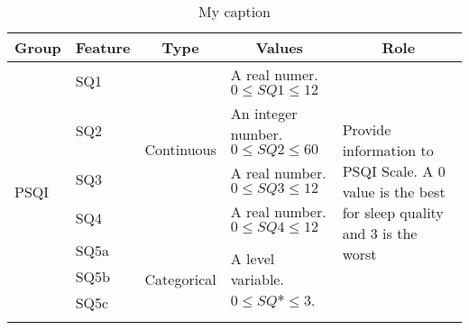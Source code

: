 \documentclass[10pt,letterpaper,oneside]{article}
\begin{document}
\begin{table}[]
	\centering
	\caption{My caption}
	\label{my-label}
	\begin{tabular}{|l|l|l|p{3cm}|p{5cm}|}
		\hline
		\multicolumn{1}{|c|}{\textbf{Group}} & \multicolumn{1}{c|}{\textbf{Feature}} & \multicolumn{1}{c|}{\textbf{Type}} & \multicolumn{1}{c|}{\textbf{Values}}                    & \multicolumn{1}{c|}{\textbf{Role}}                                                                              \\ \hline
		\multirow{18}{*}{PSQI}               & SQ1                                   & \multirow{4}{*}{Continuous}        & A real numer.   $ 0 \leq  SQ1 \leq 12 $                    & \multirow{18}{5cm}{Provide information to PSQI Scale. A 0 value is the best for sleep quality and 3 is the worst} \\ \cline{2-2} \cline{4-4}
		& SQ2                                   &                                    & An integer number. $ 0 \leq SQ2 \leq 60 $               &                                                                                                                 \\ \cline{2-2} \cline{4-4}
		& SQ3                                   &                                    & A real number. $ 0 \leq SQ3 \leq 12 $                      &                                                                                                                 \\ \cline{2-2} \cline{4-4}
		& SQ4                                   &                                    & A real number. $ 0 \leq SQ4 \leq 12 $                      &                                                                                                                 \\ \cline{2-4}
		& SQ5a                                  & \multirow{14}{*}{Categorical}      & \multirow{14}{3cm}{A level variable. $ 0 \leq SQ* \leq 3 $.} &                                                                                                                 \\ \cline{2-2}
		& SQ5b                                  &                                    &                                                         &                                                                                                                 \\ \cline{2-2}
		& SQ5c                                  &                                    &                                                         &                                                                                                                 \\ \cline{2-2}

\end{tabular}
\end{table}
\end{document}
